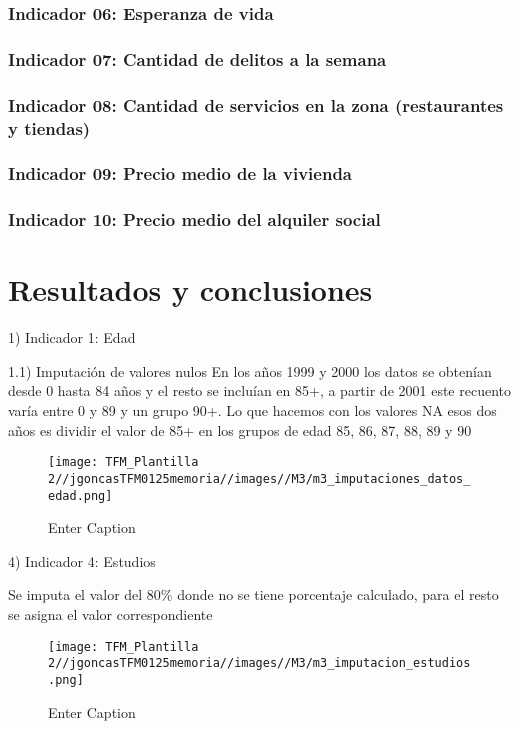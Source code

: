 \documentclass[12pt,a4paper,twoside]{book}
\begin{document}
\subsection{Indicador 06: Esperanza de vida}

\subsection{Indicador 07: Cantidad de delitos a la semana}

\subsection{Indicador 08: Cantidad de servicios en la zona (restaurantes y tiendas)}

\subsection{Indicador 09: Precio medio de la vivienda}

\subsection{Indicador 10: Precio medio del alquiler social}

\chapter{Resultados y conclusiones}

1) Indicador 1: Edad

1.1) Imputación de valores nulos
En los años 1999 y 2000 los datos se obtenían desde 0 hasta 84 años y el resto se incluían en 85+, a partir de 2001 este recuento varía entre 0 y 89 y un grupo 90+. Lo que hacemos con los valores NA esos dos años es dividir el valor de 85+ en los grupos de edad 85, 86, 87, 88, 89 y 90

\begin{figure}
    \centering
    \texttt{[image: TFM\_Plantilla 2//jgoncasTFM0125memoria//images//M3/m3\_imputaciones\_datos\_edad.png]}
    \caption{Enter Caption}
    \label{fig:enter-label}
\end{figure}

4) Indicador 4: Estudios

Se imputa el valor del 80\% donde no se tiene porcentaje calculado, para el resto se asigna el valor correspondiente

\begin{figure}
    \centering
    \texttt{[image: TFM\_Plantilla 2//jgoncasTFM0125memoria//images//M3/m3\_imputacion\_estudios.png]}
    \caption{Enter Caption}
    \label{fig:enter-label}
\end{figure}
\end{document}
